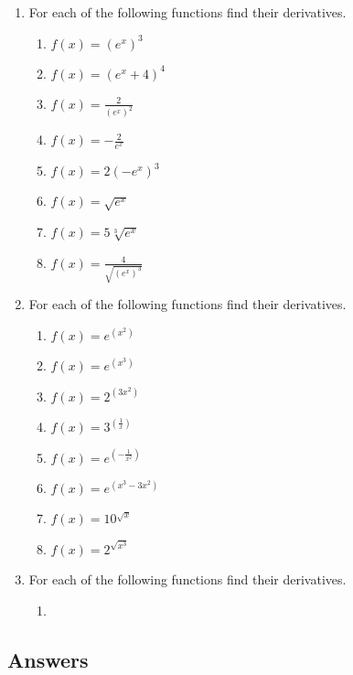 \documentclass[a4paper,12pt]{article}
\begin{document}
\begin{enumerate}
\item For each of the following functions find their derivatives.
    \begin{multicols}{2}
    \begin{enumerate}
    \item \spacer$f(x) = (e^x)^3$
    \item \spacer$f(x) = (e^x + 4)^4$
    \item \spacer$f(x) = \frac{2}{(e^x)^2}$
    \item \spacer$f(x) = -\frac{2}{e^x}$
    \item \spacer$f(x) = 2(-e^x)^3$
    \item \spacer$f(x) = \sqrt{e^x}$
    \item \spacer$f(x) = 5\sqrt[3]{e^x}$
    \item \spacer$f(x) = \frac{4}{\sqrt{(e^x)^3}}$
    \end{enumerate}
    \end{multicols}

\item For each of the following functions find their derivatives. 
    \begin{multicols}{2}
    \begin{enumerate}
    \item \sspacer$f(x) = e^{(x^2)}$
    \item \sspacer$f(x) = e^{(x^3)}$
    \item \sspacer$f(x) = 2^{(3x^2)}$
    \item \sspacer$f(x) = 3^{\left(\frac{1}{x}\right)}$
    \item \sspacer$f(x) = e^{\left(-\frac{1}{x^2}\right)}$
    \item \sspacer$f(x) = e^{(x^3 - 3x^2)}$
    \item \sspacer$f(x) = 10^{\sqrt{x}}$
    \item \sspacer$f(x) = 2^{\sqrt{x^3}}$
    \end{enumerate}
    \end{multicols}

\item For each of the following functions find their derivatives.
    \begin{multicols}{2}
    \begin{enumerate}
    \item 
    \end{enumerate}
    \end{multicols}
\end{enumerate}
\newpage
\subsection*{Answers}
\end{document}
